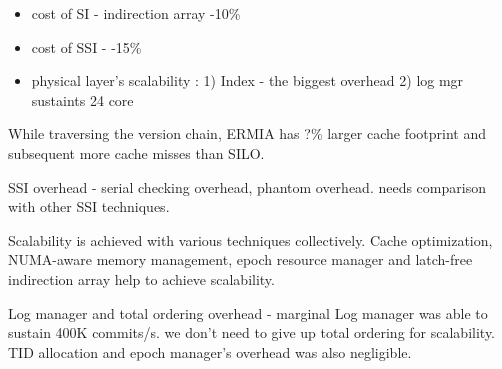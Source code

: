 \begin{itemize}
\item cost of SI - indirection array  -10\%
\item cost of SSI - -15\%
\item physical layer's scalability : 1) Index - the biggest overhead 2) log mgr sustaints 24 core
\end{itemize}

While traversing the version chain, ERMIA has ?\% larger cache footprint and subsequent more cache misses than SILO. 

SSI overhead - serial checking overhead, phantom overhead. needs comparison with other SSI techniques.  

Scalability is achieved with various techniques collectively. Cache optimization, NUMA-aware memory management, epoch resource manager and latch-free indirection array help to achieve scalability. 

Log manager and total ordering overhead - marginal
Log manager was able to sustain 400K commits/s. we don't need to give up total ordering for scalability.
TID allocation and epoch manager's overhead was also negligible. 

